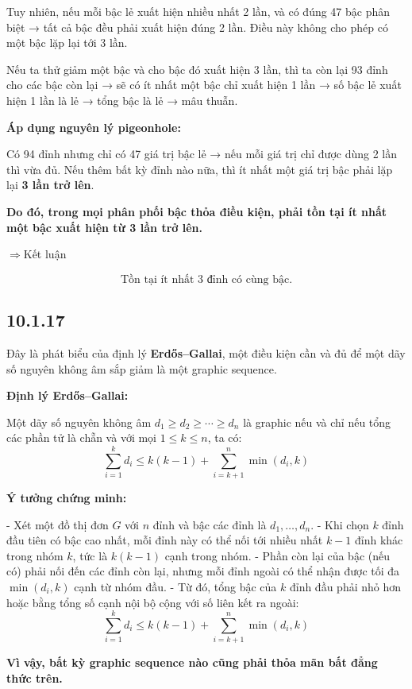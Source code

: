 \documentclass{article}
\begin{document}
	Tuy nhiên, nếu mỗi bậc lẻ xuất hiện nhiều nhất 2 lần, và có đúng 47 bậc phân biệt → tất cả bậc đều phải xuất hiện đúng 2 lần. Điều này không cho phép có một bậc lặp lại tới 3 lần.
	
	Nếu ta thử giảm một bậc và cho bậc đó xuất hiện 3 lần, thì ta còn lại 93 đỉnh cho các bậc còn lại → sẽ có ít nhất một bậc chỉ xuất hiện 1 lần → số bậc lẻ xuất hiện 1 lần là lẻ → tổng bậc là lẻ → mâu thuẫn.
	
	\bigskip
	
	\textbf{Áp dụng nguyên lý pigeonhole:}
	
	Có 94 đỉnh nhưng chỉ có 47 giá trị bậc lẻ → nếu mỗi giá trị chỉ được dùng 2 lần thì vừa đủ. Nếu thêm bất kỳ đỉnh nào nữa, thì ít nhất một giá trị bậc phải lặp lại \textbf{3 lần trở lên}.
	
	\textbf{Do đó, trong mọi phân phối bậc thỏa điều kiện, phải tồn tại ít nhất một bậc xuất hiện từ 3 lần trở lên.}
	
	$\Rightarrow${Kết luận}
	
	\[
	\boxed{\text{Tồn tại ít nhất 3 đỉnh có cùng bậc.}}
	\]
	
	\subsection*{10.1.17}
	Đây là phát biểu của định lý \textbf{Erdős–Gallai}, một điều kiện cần và đủ để một dãy số nguyên không âm sắp giảm là một graphic sequence.
	
	\textbf{Định lý Erdős–Gallai:}
	
	Một dãy số nguyên không âm \( d_1 \geq d_2 \geq \cdots \geq d_n \) là graphic nếu và chỉ nếu tổng các phần tử là chẵn và với mọi \( 1 \leq k \leq n \), ta có:
	\[
	\sum_{i=1}^{k} d_i \leq k(k-1) + \sum_{i=k+1}^{n} \min(d_i, k)
	\]
	
	\textbf{Ý tưởng chứng minh:}
	
	- Xét một đồ thị đơn \( G \) với \( n \) đỉnh và bậc các đỉnh là \( d_1, \dots, d_n \).
	- Khi chọn \( k \) đỉnh đầu tiên có bậc cao nhất, mỗi đỉnh này có thể nối tới nhiều nhất \( k-1 \) đỉnh khác trong nhóm \( k \), tức là \( k(k-1) \) cạnh trong nhóm.
	- Phần còn lại của bậc (nếu có) phải nối đến các đỉnh còn lại, nhưng mỗi đỉnh ngoài có thể nhận được tối đa \( \min(d_i, k) \) cạnh từ nhóm đầu.
	- Từ đó, tổng bậc của \( k \) đỉnh đầu phải nhỏ hơn hoặc bằng tổng số cạnh nội bộ cộng với số liên kết ra ngoài:
	\[
	\sum_{i=1}^{k} d_i \leq k(k-1) + \sum_{i=k+1}^{n} \min(d_i, k)
	\]
	
	\textbf{Vì vậy, bất kỳ graphic sequence nào cũng phải thỏa mãn bất đẳng thức trên.}
	
\end{document}
